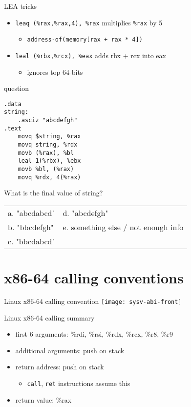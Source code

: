 \begin{frame}[fragile,label=LEATricks]{LEA tricks}
    \begin{itemize}
    \item {}\lstinline|leaq (%rax,%rax,4), %rax| multiplies {\tt \%rax} by 5
        \begin{itemize}
        \item {\tt address-of(memory[rax + rax * 4])}
        \end{itemize}
    \item {}\lstinline|leal (%rbx,%rcx), %eax| adds rbx + rcx into eax
        \begin{itemize}
        \item ignores top 64-bits
        \end{itemize}
    \end{itemize}
\end{frame}

\begin{frame}[fragile,label=question]{question}
\lstset{style=small,language=myasm}
\begin{lstlisting}
.data
string:
    .asciz "abcdefgh"
.text
    movq $string, %rax
    movq string, %rdx
    movb (%rax), %bl
    leal 1(%rbx), %ebx
    movb %bl, (%rax)
    movq %rdx, 4(%rax)
\end{lstlisting}
{\small What is the final value of string?}
\begin{tabular}{ll}
a. "abcdabcd" & d. "abcdefgh" \\
b. "bbcdefgh" & e. something else / not enough info \\
c. "bbcdabcd" & ~ \\
\end{tabular}
\end{frame}

\section{x86-64 calling conventions}

\begin{frame}{Linux x86-64 calling convention}
    \texttt{[image: sysv-abi-front]}
\end{frame}

\begin{frame}{Linux x86-64 calling summary}
\begin{itemize}
    \item first 6 arguments: \%rdi, \%rsi, \%rdx, \%rcx, \%r8, \%r9
    \item additional arguments: push on stack
    \item return address: push on stack
        \begin{itemize}
        \item {\tt call}, {\tt ret} instructions assume this
        \end{itemize}
    \item return value: \%rax
\end{itemize}
\end{frame}

